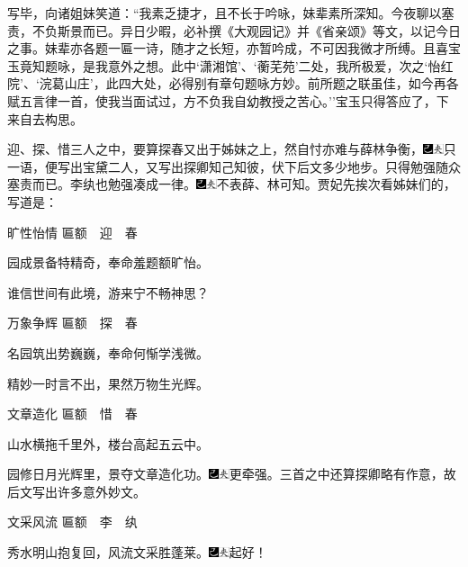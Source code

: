 写毕，向诸姐妹笑道：``我素乏捷才，且不长于吟咏，妹辈素所深知。今夜聊以塞责，不负斯景而已。异日少暇，必补撰《大观园记》并《省亲颂》等文，以记今日之事。妹辈亦各题一匾一诗，随才之长短，亦暂吟成，不可因我微才所缚。且喜宝玉竟知题咏，是我意外之想。此中`潇湘馆'、`蘅芜苑'二处，我所极爱，次之`怡红院'、`浣葛山庄'，此四大处，必得别有章句题咏方妙。前所题之联虽佳，如今再各赋五言律一首，使我当面试过，方不负我自幼教授之苦心。''宝玉只得答应了，下来自去构思。

迎、探、惜三人之中，要算探春又出于姊妹之上，然自忖亦难与薛林争衡，{\includegraphics[width=3mm]{../Images/00003}\includegraphics[width=3mm]{../Images/00012}\footnotesize \kaishu 只一语，便写出宝黛二人，又写出探卿知己知彼，伏下后文多少地步。}只得勉强随众塞责而已。李纨也勉强凑成一律。{\includegraphics[width=3mm]{../Images/00003}\includegraphics[width=3mm]{../Images/00012}\footnotesize \kaishu 不表薛、林可知。}贾妃先挨次看姊妹们的，写道是：

旷性怡情 {匾额}　迎　春

园成景备特精奇，奉命羞题额旷怡。

谁信世间有此境，游来宁不畅神思？

万象争辉 {匾额}　探　春

名园筑出势巍巍，奉命何惭学浅微。

精妙一时言不出，果然万物生光辉。

文章造化 {匾额}　惜　春

山水横拖千里外，楼台高起五云中。

园修日月光辉里，景夺文章造化功。{\includegraphics[width=3mm]{../Images/00003}\includegraphics[width=3mm]{../Images/00012}\footnotesize \kaishu 更牵强。三首之中还算探卿略有作意，故后文写出许多意外妙文。}

文采风流 {匾额}　李　纨

秀水明山抱复回，风流文采胜蓬莱。{\includegraphics[width=3mm]{../Images/00003}\includegraphics[width=3mm]{../Images/00012}\footnotesize \kaishu 起好！}

